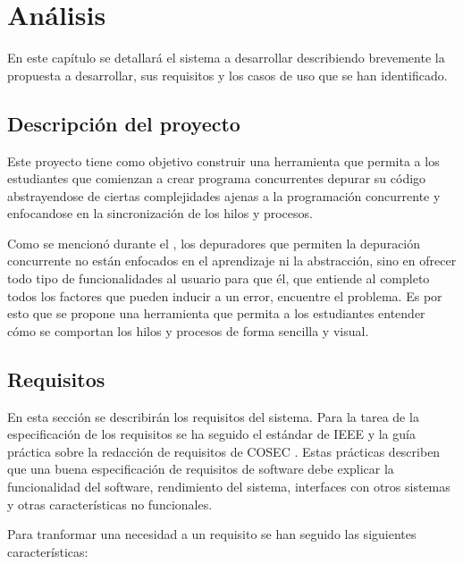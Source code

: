 \chapter{Análisis}\label{chap:analisis}
En este capítulo se detallará el sistema a desarrollar describiendo brevemente la propuesta a desarrollar, sus requisitos y los casos de uso que se han identificado.

\section{Descripción del proyecto}\label{sec:descripcion}
Este proyecto tiene como objetivo construir una herramienta que permita a los estudiantes que comienzan a crear \glspl{programa concurrente} depurar su código abstrayendose de ciertas complejidades ajenas a la programación concurrente y enfocandose en la sincronización de los hilos y procesos.

Como se mencionó durante el , los depuradores que permiten la depuración concurrente no están enfocados en el aprendizaje ni la abstracción, sino en ofrecer todo tipo de funcionalidades al usuario para que él, que entiende al completo todos los factores que pueden inducir a un error, encuentre el problema. Es por esto que se propone una herramienta que permita a los estudiantes entender cómo se comportan los hilos y procesos de forma sencilla y visual.

\section{Requisitos}\label{sec:requisitos}

En esta sección se describirán los requisitos del sistema. Para la tarea de la especificación de los requisitos se ha seguido el estándar de IEEE \cite{IEEE-Requirements} y la guía práctica sobre la redacción de requisitos de COSEC \cite{INCOSE-Requirements}. Estas prácticas describen que una buena especificación de requisitos de software debe explicar la funcionalidad del software, rendimiento del sistema, interfaces con otros sistemas y otras características no funcionales.

Para tranformar una necesidad a un requisito se han seguido las siguientes características:


